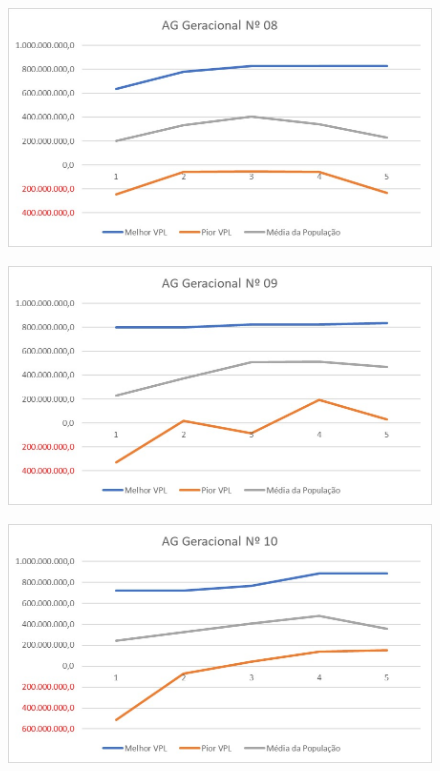\documentclass[12pt,a4paper]{report}
\begin{document}
\begin{figure}[H]
\centering

\includegraphics[scale=1]{ApC/AGG/8}

\end{figure}

\begin{figure}[H]
\centering

\includegraphics[scale=1]{ApC/AGG/9}

\end{figure}

\begin{figure}[H]
\centering

\includegraphics[scale=1]{ApC/AGG/10}

\end{figure}
\end{document}
